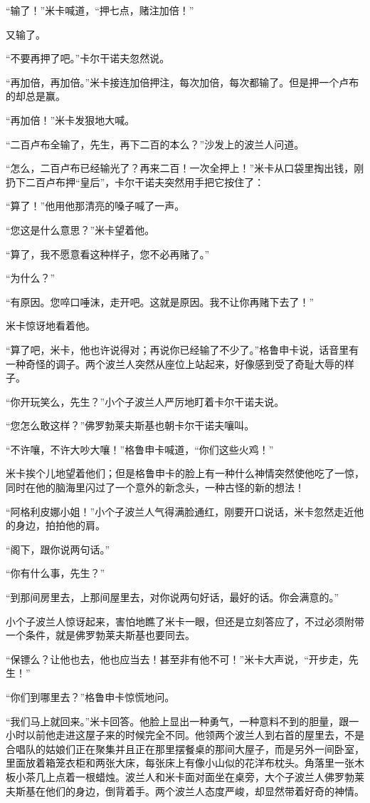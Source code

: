 \par “输了！”米卡喊道，“押七点，赌注加倍！”
\par 又输了。
\par “不要再押了吧。”卡尔干诺夫忽然说。
\par “再加倍，再加倍。”米卡接连加倍押注，每次加倍，每次都输了。但是押一个卢布的却总是赢。
\par “再加倍！”米卡发狠地大喊。
\par “二百卢布全输了，先生，再下二百的本么？”沙发上的波兰人问道。
\par “怎么，二百卢布已经输光了？再来二百！一次全押上！”米卡从口袋里掏出钱，刚扔下二百卢布押“皇后”，卡尔干诺夫突然用手把它按住了：
\par “算了！”他用他那清亮的嗓子喊了一声。
\par “您这是什么意思？”米卡望着他。
\par “算了，我不愿意看这种样子，您不必再赌了。”
\par “为什么？”
\par “有原因。您啐口唾沫，走开吧。这就是原因。我不让你再赌下去了！”
\par 米卡惊讶地看着他。
\par “算了吧，米卡，他也许说得对；再说你已经输了不少了。”格鲁申卡说，话音里有一种奇怪的调子。两个波兰人突然从座位上站起来，好像感到受了奇耻大辱的样子。
\par “你开玩笑么，先生？”小个子波兰人严厉地盯着卡尔干诺夫说。
\par “您怎么敢这样？”佛罗勃莱夫斯基也朝卡尔干诺夫嚷叫。
\par “不许嚷，不许大吵大嚷！”格鲁申卡喊道，“你们这些火鸡！”
\par 米卡挨个儿地望着他们；但是格鲁申卡的脸上有一种什么神情突然使他吃了一惊，同时在他的脑海里闪过了一个意外的新念头，一种古怪的新的想法！
\par “阿格利皮娜小姐！”小个子波兰人气得满脸通红，刚要开口说话，米卡忽然走近他的身边，拍拍他的肩。
\par “阁下，跟你说两句话。”
\par “你有什么事，先生？”
\par “到那间房里去，上那间屋里去，对你说两句好话，最好的话。你会满意的。”
\par 小个子波兰人惊讶起来，害怕地瞧了米卡一眼，但还是立刻答应了，不过必须附带一个条件，就是佛罗勃莱夫斯基也要同去。
\par “保镖么？让他也去，他也应当去！甚至非有他不可！”米卡大声说，“开步走，先生！”
\par “你们到哪里去？”格鲁申卡惊慌地问。
\par “我们马上就回来。”米卡回答。他脸上显出一种勇气，一种意料不到的胆量，跟一小时以前他走进这屋子来的时候完全不同。他领两个波兰人到右首的屋里去，不是合唱队的姑娘们正在聚集并且正在那里摆餐桌的那间大屋子，而是另外一间卧室，里面放着箱笼衣柜和两张大床，每张床上有像小山似的花洋布枕头。角落里一张木板小茶几上点着一根蜡烛。波兰人和米卡面对面坐在桌旁，大个子波兰人佛罗勃莱夫斯基在他们的身边，倒背着手。两个波兰人态度严峻，却显然带着好奇的神情。
